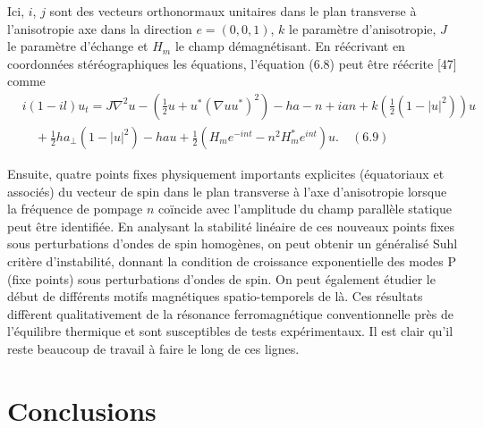 \documentclass{article}
\begin{document}
   Ici, \(i\), \(j\) sont des vecteurs orthonormaux unitaires dans le plan transverse à l'anisotropie
   axe dans la direction \(e = (0, 0, 1)\), \(k\) le paramètre d'anisotropie, \(J\) le paramètre d'échange
   et \(H_m\) le champ démagnétisant. En réécrivant en coordonnées stéréographiques
   les équations, l'équation (6.8) peut être réécrite [47] comme
   \begin{align*}
   &i(1 - il)u_t = J \nabla^2 u - \left(\frac{1}{2}u + u^*(\nabla u u^*)^2\right) - ha - n + ian + k\left(\frac{1}{2}(1 - |u|^2)\right)u \\
   &\quad + \frac{1}{2}ha_{\perp}(1 - |u|^2) - ha u + \frac{1}{2}(H_m e^{-int} - n^2 H_m^* e^{int})u. \quad (6.9)
   \end{align*}
   
   Ensuite, quatre points fixes physiquement importants explicites (équatoriaux et associés)
   du vecteur de spin dans le plan transverse à l'axe d'anisotropie lorsque
   la fréquence de pompage \(n\) coïncide avec l'amplitude du champ parallèle statique peut être identifiée. En analysant la stabilité linéaire de ces nouveaux points fixes
   sous perturbations d'ondes de spin homogènes, on peut obtenir un généralisé Suhl
   critère d'instabilité, donnant la condition de croissance exponentielle des modes P (fixe
   points) sous perturbations d'ondes de spin. On peut également étudier le début de différents
   motifs magnétiques spatio-temporels de là. Ces résultats diffèrent qualitativement
   de la résonance ferromagnétique conventionnelle près de l'équilibre thermique et sont
   susceptibles de tests expérimentaux. Il est clair qu'il reste beaucoup de travail à faire
   le long de ces lignes.
   
   \section{Conclusions}
   
\end{document}
